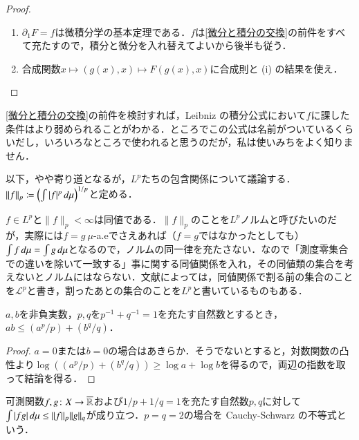 \begin{proof}
\leavevmode
\begin{enumerate}
\item $\partial_1 F = f$は微積分学の基本定理である．$f$は\cref{微分と積分の交換}の前件をすべて充たすので，積分と微分を入れ替えてよいから後半も従う．
\item 合成関数$x \mapsto (g(x), x) \mapsto F(g(x), x)$に合成則と (i) の結果を使え．
\end{enumerate}
\end{proof}

\begin{que}
\cref{微分と積分の交換}の前件を検討すれば，Leibniz の積分公式において$f$に課した条件はより弱められることがわかる．ところでこの公式は名前がついているくらいだし，いろいろなところで使われると思うのだが，私は使いみちをよく知りません．
\end{que}

以下，やや寄り道となるが，$L^p$たちの包含関係について議論する．$\|f\|_p \coloneqq \left(\int |f|^p \mathop{}\!d \mu\right)^{1/p}$と定める．

\begin{que}[*]
$f \in L^p$と$\|f\|_p < \infty$は同値である．$\|f\|_p$のことを$L^p$ノルムと呼びたいのだが，実際には$f=g \ \mu$-a.eでさえあれば（$f=g$ではなかったとしても）$\int f \mathop{}\!d \mu = \int g \mathop{}\!d \mu$となるので，ノルムの同一律を充たさない．なので「測度零集合での違いを除いて一致する」事に関する同値関係を入れ，その同値類の集合を考えないとノルムにはならない．文献によっては，同値関係で割る前の集合のことを$\mathcal{L}^p$と書き，割ったあとの集合のことを$L^p$と書いているものもある．
\end{que}

\begin{thm}
$a,b$を非負実数，$p,q$を$p^{-1}+ q^{-1}=1$を充たす自然数とするとき，$ab \leq (a^p/p) + (b^q/q)$．
\end{thm}

\begin{proof}
$a=0$または$b=0$の場合はあきらか．そうでないとすると，対数関数の凸性より$\log((a^p/p) + (b^q/q)) \geq \log a + \log b$を得るので，両辺の指数を取って結論を得る．
\end{proof}

\begin{thm}
可測関数$f,g \colon X \to \overline{\mathbb{R}}$および$1/p+1/q=1$を充たす自然数$p,q$に対して$\int |fg| \mathop{}\!d \mu \leq \|f\|_p \|g\|_q$が成り立つ．$p=q=2$の場合を Cauchy-Schwarz の不等式という．
\end{thm}

